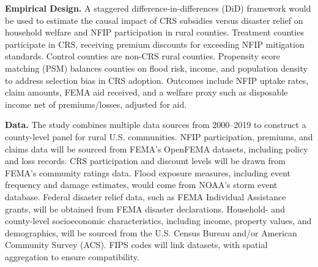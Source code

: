 \textbf{Empirical Design.} A staggered difference-in-differences (DiD) framework would be used to estimate the causal impact of CRS subsidies versus disaster relief on household welfare and NFIP participation in rural counties. Treatment counties participate in CRS, receiving premium discounts for exceeding NFIP mitigation standards. Control counties are non-CRS rural counties. Propensity score matching (PSM) balances counties on flood risk, income, and population density to address selection bias in CRS adoption. Outcomes include NFIP uptake rates, claim amounts, FEMA aid received, and a welfare proxy such as disposable income net of premiums/losses, adjusted for aid.

\textbf{Data.} The study combines multiple data sources from 2000–2019 to construct a county-level panel for rural U.S. communities. NFIP participation, premiums, and claims data will be sourced from FEMA’s OpenFEMA datasets, including policy and loss records. CRS participation and discount levels will be drawn from FEMA’s community ratings data. Flood exposure measures, including event frequency and damage estimates, would come from NOAA’s storm event database. Federal disaster relief data, such as FEMA Individual Assistance grants, will be obtained from FEMA disaster declarations. Household- and county-level socioeconomic characteristics, including income, property values, and demographics, will be sourced from the U.S. Census Bureau and/or American Community Survey (ACS). FIPS codes will link datasets, with spatial aggregation to ensure compatibility.




